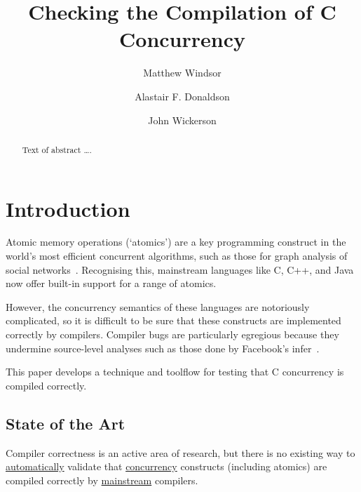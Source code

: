 \documentclass[acmsmall,review]{acmart}
\begin{document}
\title{Checking the Compilation of C Concurrency}  

\author{Matthew Windsor}

\author{Alastair F. Donaldson}

\author{John Wickerson}

\begin{abstract}
Text of abstract \ldots.
\end{abstract}

\maketitle

\section{Introduction}

Atomic memory operations (`atomics') are a key programming construct in the world's most efficient concurrent algorithms, such as those for graph analysis of social networks~\cite{lenharth+16}.
Recognising this, mainstream languages like C, C++, and Java now offer built-in support for a range of atomics.

However, the concurrency semantics of these languages are notoriously complicated, so it is difficult to be sure that these constructs are implemented correctly by compilers.
Compiler bugs are particularly egregious because they undermine source-level analyses such as those done by Facebook's {\sc infer}~\cite{calcagno+15}.

This paper develops a technique and toolflow for testing that C concurrency is compiled correctly.

\subsection{State of the Art}

Compiler correctness is an active area of research, but there is no existing way to \ul{automatically} validate that \ul{concurrency} constructs (including atomics) are compiled correctly by \ul{mainstream} compilers.
\end{document}
